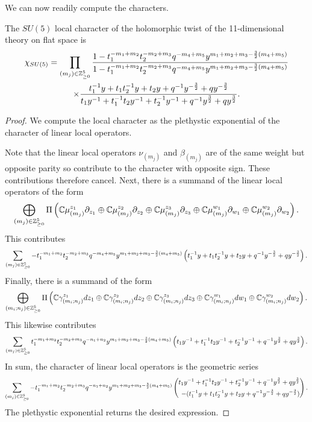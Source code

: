 We can now readily compute the characters.
\begin{prop}\label{prop:locchar}
The $SU(5)$ local character of the holomorphic twist of the 11-dimensional theory on flat space is
\begin{multline}
\chi_{SU(5)} = 
\prod_ {(m_j)\in \mathbb{Z}^5_{\geq 0}} \frac{1- t_1^{-m_1+m_2}t_2^{-m_2+m_3}q^{-m_4+m_5}y^{m_1+m_2+m_3-\frac 3 2 (m_4+m_5)}}{1- t_1^{-m_1+m_2}t_2^{-m_2+m_3}q^{-m_4+m_5}y^{m_1+m_2+m_3-\frac 3 2 (m_4+m_5)} }
\\ 
\times \frac{t_1^{-1}y + t_1t_2^{-1}y + t_2y + q^{-1}y^{-\frac 3 2} + qy^{-\frac 3 2}}{t_1y^{-1} + t_1^{-1}t_2y^{-1} + t_2^{-1}y^{-1} + q^{-1}y^{\frac 3 2} + qy^{\frac 3 2}}.
\end{multline}
\end{prop}
\begin{proof}
We compute the local character as the plethystic exponential of the character of linear local operators. 

Note that the linear local operators $ \nu_{(m_j)}$ and $\beta_{(m_j)}$ are of the same weight but opposite parity so contribute to the character with opposite sign. These contributions therefore cancel. Next, there is a summand of the linear local operators of the form 
\[
\bigoplus _{(m_j)\in \mathbb{Z}^5_{\geq 0 }} \Pi \left ( \mathbb{C}\mu^{z_1}_{(m_j)}\partial_{z_1}\oplus \mathbb{C}\mu^{z_2}_{(m_j)}\partial_{z_2}\oplus \mathbb{C}\mu^{z_3}_{(m_j)}\partial_{z_3}\oplus\mathbb{C}\mu^{w_1}_{(m_j)}\partial_{w_1}\oplus \mathbb{C}\mu^{w_2}_{(m_j)}\partial_{w_2}\right).
\] 
This contributes 
\[
\sum_{(m_j)\in \mathbb{Z}^5_{\geq 0 }}- t_1^{-m_1+m_2}t_2^{-m_2+m_3}q^{-m_4+m_5}y^{m_1+m_2+m_3-\frac 3 2 (m_4+m_5)}\left (t_1^{-1}y + t_1t_2^{-1}y + t_2y + q^{-1}y^{-\frac 3 2} + qy^{-\frac 3 2} \right).
\] 
Finally, there is a summand of the form 
\[
\bigoplus _{(m_i;n_j)\in \mathbb{Z}^5_{\geq 0 }} \Pi \left ( \mathbb{C}\gamma^{z_1}_{(m_i; n_j)}d{z_1}\oplus \mathbb{C}\gamma^{z_2}_{(m_i; n_j)}d{z_2}\oplus\mathbb{C}\gamma^{z_3}_{(m_i; n_j)}d{z_3}\oplus\mathbb{C}\gamma^{w_1}_{(m_i; n_j)}d{w_1}\oplus \mathbb{C}\gamma^{w_2}_{(m_i; n_j)}d {w_2}\right).
\] 
This likewise contributes 
\[
\sum_{(m_j)\in \mathbb{Z}^5_{\geq 0 }}t_1^{-m_1+m_2}t_2^{-m_2+m_3}q^{-n_1+n_2}y^{m_1+m_2+m_3-\frac 3 2 (m_4+m_5)}\left (t_1y^{-1} + t_1^{-1}t_2y^{-1} + t_2^{-1}y^{-1} + q^{-1}y^{\frac 3 2} + qy^{\frac 3 2} \right).
\] 
In sum, the character of linear local operators is the geometric series 
\[
\sum_{(m_j)\in \mathbb{Z}^5_{\geq 0 }}-t_1^{-m_1+m_2}t_2^{-m_2+m_3}q^{-n_1+n_2}y^{m_1+m_2+m_3-\frac 3 2 (m_4+m_5)}\left (\begin{aligned}t_1y^{-1} + t_1^{-1}t_2y^{-1} + t_2^{-1}y^{-1} + q^{-1}y^{\frac 3 2} + qy^{\frac 3 2} \\  - (t_1^{-1}y + t_1t_2^{-1}y + t_2y + q^{-1}y^{-\frac 3 2} + qy^{-\frac 3 2})\end{aligned}\right).
\] 
The plethystic exponential returns the desired expression.
\end{proof}

